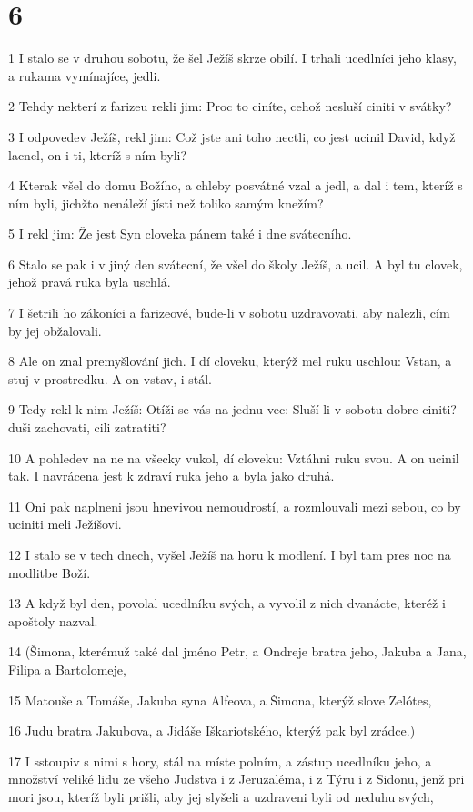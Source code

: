 \chapter{6}

\par 1 I stalo se v druhou sobotu, že šel Ježíš skrze obilí. I trhali ucedlníci jeho klasy, a rukama vymínajíce, jedli.
\par 2 Tehdy nekterí z farizeu rekli jim: Proc to ciníte, cehož nesluší ciniti v svátky?
\par 3 I odpovedev Ježíš, rekl jim: Což jste ani toho nectli, co jest ucinil David, když lacnel, on i ti, kteríž s ním byli?
\par 4 Kterak všel do domu Božího, a chleby posvátné vzal a jedl, a dal i tem, kteríž s ním byli, jichžto nenáleží jísti než toliko samým knežím?
\par 5 I rekl jim: Že jest Syn cloveka pánem také i dne svátecního.
\par 6 Stalo se pak i v jiný den svátecní, že všel do školy Ježíš, a ucil. A byl tu clovek, jehož pravá ruka byla uschlá.
\par 7 I šetrili ho zákoníci a farizeové, bude-li v sobotu uzdravovati, aby nalezli, cím by jej obžalovali.
\par 8 Ale on znal premyšlování jich. I dí cloveku, kterýž mel ruku uschlou: Vstan, a stuj v prostredku. A on vstav, i stál.
\par 9 Tedy rekl k nim Ježíš: Otíži se vás na jednu vec: Sluší-li v sobotu dobre ciniti? duši zachovati, cili zatratiti?
\par 10 A pohledev na ne na všecky vukol, dí cloveku: Vztáhni ruku svou. A on ucinil tak. I navrácena jest k zdraví ruka jeho a byla jako druhá.
\par 11 Oni pak naplneni jsou hnevivou nemoudrostí, a rozmlouvali mezi sebou, co by uciniti meli Ježíšovi.
\par 12 I stalo se v tech dnech, vyšel Ježíš na horu k modlení. I byl tam pres noc na modlitbe Boží.
\par 13 A když byl den, povolal ucedlníku svých, a vyvolil z nich dvanácte, kteréž i apoštoly nazval.
\par 14 (Šimona, kterémuž také dal jméno Petr, a Ondreje bratra jeho, Jakuba a Jana, Filipa a Bartolomeje,
\par 15 Matouše a Tomáše, Jakuba syna Alfeova, a Šimona, kterýž slove Zelótes,
\par 16 Judu bratra Jakubova, a Jidáše Iškariotského, kterýž pak byl zrádce.)
\par 17 I sstoupiv s nimi s hory, stál na míste polním, a zástup ucedlníku jeho, a množství veliké lidu ze všeho Judstva i z Jeruzaléma, i z Týru i z Sidonu, jenž pri mori jsou, kteríž byli prišli, aby jej slyšeli a uzdraveni byli od neduhu svých,
